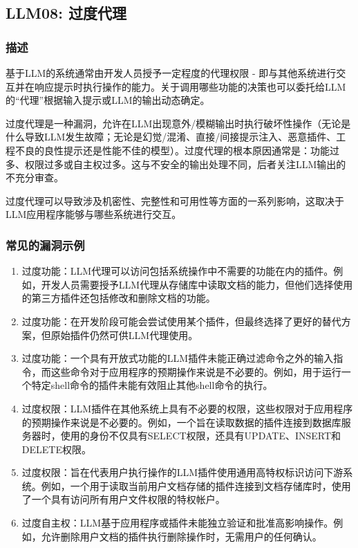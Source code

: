 \documentclass[
]{article}
\author{}
\date{}
\providecommand{\tightlist}{%
  \setlength{\itemsep}{0pt}\setlength{\parskip}{0pt}}
\begin{document}
\subsection{LLM08: 过度代理}\label{llm08-ux8fc7ux5ea6ux4ee3ux7406}

\subsubsection{描述}\label{ux63cfux8ff0}

基于LLM的系统通常由开发人员授予一定程度的代理权限 -
即与其他系统进行交互并在响应提示时执行操作的能力。关于调用哪些功能的决策也可以委托给LLM的``代理''根据输入提示或LLM的输出动态确定。

过度代理是一种漏洞，允许在LLM出现意外/模糊输出时执行破坏性操作（无论是什么导致LLM发生故障；无论是幻觉/混淆、直接/间接提示注入、恶意插件、工程不良的良性提示还是性能不佳的模型）。过度代理的根本原因通常是：功能过多、权限过多或自主权过多。这与不安全的输出处理不同，后者关注LLM输出的不充分审查。

过度代理可以导致涉及机密性、完整性和可用性等方面的一系列影响，这取决于LLM应用程序能够与哪些系统进行交互。

\subsubsection{常见的漏洞示例}\label{ux5e38ux89c1ux7684ux6f0fux6d1eux793aux4f8b}

\begin{enumerate}
\def\labelenumi{\arabic{enumi}.}
\tightlist
\item
  过度功能：LLM代理可以访问包括系统操作中不需要的功能在内的插件。例如，开发人员需要授予LLM代理从存储库中读取文档的能力，但他们选择使用的第三方插件还包括修改和删除文档的功能。
\item
  过度功能：在开发阶段可能会尝试使用某个插件，但最终选择了更好的替代方案，但原始插件仍然可供LLM代理使用。
\item
  过度功能：一个具有开放式功能的LLM插件未能正确过滤命令之外的输入指令，而这些命令对于应用程序的预期操作来说是不必要的。例如，用于运行一个特定shell命令的插件未能有效阻止其他shell命令的执行。
\item
  过度权限：LLM插件在其他系统上具有不必要的权限，这些权限对于应用程序的预期操作来说是不必要的。例如，一个旨在读取数据的插件连接到数据库服务器时，使用的身份不仅具有SELECT权限，还具有UPDATE、INSERT和DELETE权限。
\item
  过度权限：旨在代表用户执行操作的LLM插件使用通用高特权标识访问下游系统。例如，一个用于读取当前用户文档存储的插件连接到文档存储库时，使用了一个具有访问所有用户文件权限的特权帐户。
\item
  过度自主权：LLM基于应用程序或插件未能独立验证和批准高影响操作。例如，允许删除用户文档的插件执行删除操作时，无需用户的任何确认。
\end{enumerate}
\end{document}

